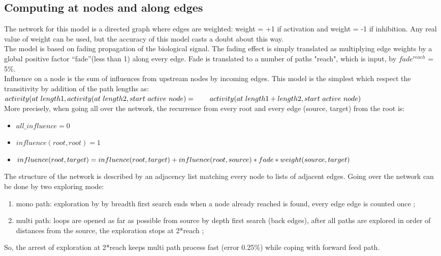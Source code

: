 \documentclass[11pt]{article}
\begin{document}
\subsection{Computing at nodes and along edges}
The network for this model is a directed graph where edges are weighted: weight = +1 if activation and weight = -1 if inhibition. Any real value of weight can be used, but the accuracy of this model casts a doubt about this way.\\
The model is based on fading propagation of the biological signal. The fading effect is simply translated as multiplying edge weights by a global positive factor \textquotedblleft fade\textquotedblright (less than 1) along every edge.  Fade is translated to a number of paths "reach", which is input, by  $fade^{reach}$ = 5\%.
\\Influence on a node is the sum of influences from upstream nodes by incoming edges. This model is the simplest which respect the transitivity by addition of the path lengths as:\\
$activity(at\ length1,activity(at\ length2,start\ active\ node)=\\\hspace*{2em}activity(at\ length1+length2, start\ active\ node)$\\
More precisely, when going all over the network, the recurrence from every root and every edge (source, target) from the root is:
\begin{itemize}
\item $all\_influence = 0$
\item $influence (root, root) = 1$
\item $influence (root, target)= influence (root, target) +\\influence (root, source) * fade * weight (source, target)$
\end{itemize}
The structure of the network is described by an adjacency list matching every node to lists of adjacent edges. Going over the network can be done by two exploring mode:
\begin{enumerate}
\item mono path: exploration by by breadth first search ends when a node already reached is found, every edge edge is counted once ; 
\item multi path: loops are opened as far as possible from source by depth first search (back edges), after all paths are explored in order of distances from the source, the exploration stops at 2*reach  ;
\end{enumerate}
So,  the arrest of exploration at 2*reach keeps multi path process fast (error 0.25\%) while coping with forward feed path.
\end{document}
